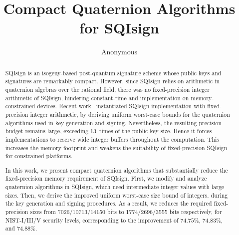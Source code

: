 \documentclass[runningheads]{llncs}
\title{Compact Quaternion Algorithms for SQIsign}
\author{Anonymous}
\institute{Anonymous}
\begin{document}
\maketitle

\begin{abstract}
SQIsign is an isogeny-based post-quantum signature scheme whose public keys and signatures are remarkably compact.
However, since SQIsign relies on arithmetic in quaternion algebras over the rational field, there was no fixed-precision integer arithmetic of SQIsign, hindering constant-time and implementation on memory-constrained devices.
Recent work~\cite{KLKL25} instantiated SQIsign implementation with fixed-precision integer arithmetic, by deriving uniform worst-case bounds for the quaternion algorithms used in key generation and signing.
Nevertheless, the resulting precision budget remains large, exceeding 13~times of the public key size.
Hence it forces implementations to reserve wide integer buffers throughout the computation.
This increases the memory footprint and weakens the suitability of fixed-precision SQIsign for constrained platforms.

In this work, we present compact quaternion algorithms that substantially reduce the fixed-precision memory requirement of SQIsign.
First, we modify and analyze quaternion algorithms in SQIsign, which need intermediate integer values with large sizes.
Then, we derive the improved uniform worst-case size bound of integers. during the key generation and signing procedures.
As a result, we reduces the required fixed-precision sizes from 7026/10713/14150 bits to 1774/2696/3555 bits respectively, for NIST-I/III/V security levels, corresponding to the improvement of $74.75\%$, $74.83\%$, and $74.88\%$.
\end{abstract}







\newpage



\appendix
\newpage

\end{document}
